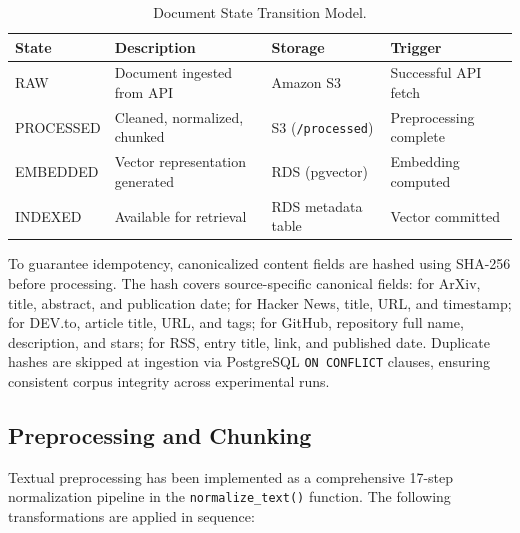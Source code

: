 \documentclass[12pt,a4paper]{report}
\begin{document}
\begin{table}[H]
\caption{Document State Transition Model.}
\label{tab:doc_states}
\centering
\begin{tabular}{p{2.0cm}p{3.8cm}p{3.0cm}p{3.0cm}}
\toprule
\textbf{State} & \textbf{Description} & \textbf{Storage} & \textbf{Trigger} \\
\midrule
RAW & Document ingested from API & Amazon S3 & Successful API fetch \\
PROCESSED & Cleaned, normalized, chunked & S3 (\texttt{/processed}) & Preprocessing complete \\
EMBEDDED & Vector representation generated & RDS (pgvector) & Embedding computed \\
INDEXED & Available for retrieval & RDS metadata table & Vector committed \\
\bottomrule
\end{tabular}
\end{table}

To guarantee idempotency, canonicalized content fields are hashed using SHA-256 before processing. The hash covers source-specific canonical fields: for ArXiv, title, abstract, and publication date; for Hacker News, title, URL, and timestamp; for DEV.to, article title, URL, and tags; for GitHub, repository full name, description, and stars; for RSS, entry title, link, and published date. Duplicate hashes are skipped at ingestion via PostgreSQL \texttt{ON CONFLICT} clauses, ensuring consistent corpus integrity across experimental runs.

\subsection{Preprocessing and Chunking}

Textual preprocessing has been implemented as a comprehensive 17-step normalization pipeline in the \texttt{normalize\_text()} function. The following transformations are applied in sequence:
\end{document}
